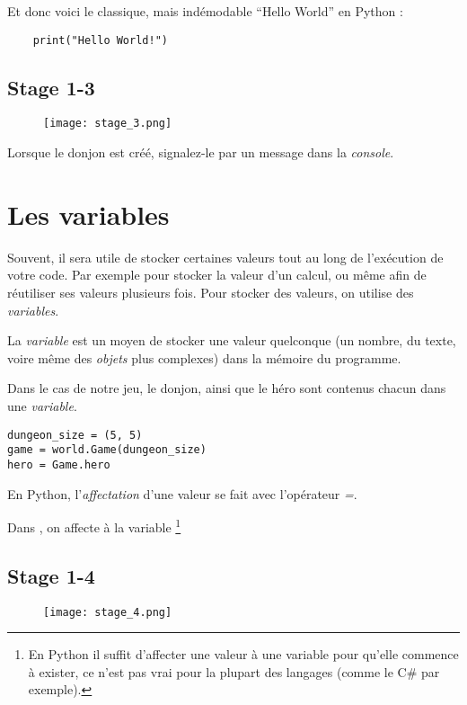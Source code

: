 Et donc voici le classique, mais indémodable “Hello World” en Python :

\begin{lstlisting}
    print("Hello World!")
\end{lstlisting}


\subsection{Stage 1-3}
\begin{figure}[ht]
\texttt{[image: stage\_3.png]} 
\end{figure}

Lorsque le donjon est créé, signalez-le par un message dans la \emph{console}.

\section{Les variables}

Souvent, il sera utile de stocker certaines valeurs tout au long de l’exécution de votre code.
Par exemple pour stocker la valeur d’un calcul, ou même afin de réutiliser ses valeurs plusieurs fois. Pour stocker des valeurs, on utilise des \emph{variables}.

La \emph{variable} est un moyen de stocker une valeur quelconque (un nombre, du texte, voire même des \emph{objets} plus complexes) dans la mémoire du programme.

Dans le cas de notre jeu, le donjon, ainsi que le héro sont contenus chacun dans une \emph{variable}.

\begin{lstlisting}
dungeon_size = (5, 5)
game = world.Game(dungeon_size)
hero = Game.hero
\end{lstlisting}

En Python, l’\emph{affectation} d’une valeur se fait avec l’opérateur \emph{=}.

Dans , on affecte  à la variable \footnote{ En Python il suffit d’affecter une valeur à une variable pour qu’elle commence à exister, ce n’est pas vrai pour la plupart des langages (comme le C\# par exemple).}

\subsection{Stage 1-4}
\begin{figure}[ht]
\texttt{[image: stage\_4.png]} 
\end{figure}

